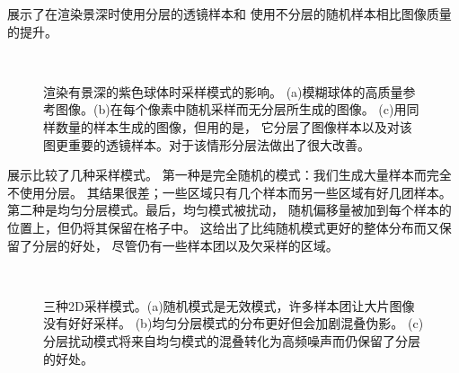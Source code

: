 展示了在渲染景深时使用分层的透镜样本和
使用不分层的随机样本相比图像质量的提升。
\begin{figure}[htbp]
    \,
    \\
    \caption{渲染有景深的紫色球体时采样模式的影响。
        (a)模糊球体的高质量参考图像。(b)在每个像素中随机采样而无分层所生成的图像。
        (c)用同样数量的样本生成的图像，但用的是，
        它分层了图像样本以及对该图更重要的透镜样本。对于该情形分层法做出了很大改善。}
    \label{fig:7.17}
\end{figure}

展示比较了几种采样模式。
第一种是完全随机的模式：我们生成大量样本而完全不使用分层。
其结果很差；一些区域只有几个样本而另一些区域有好几团样本。
第二种是均匀分层模式。最后，均匀模式被扰动，
随机偏移量被加到每个样本的位置上，但仍将其保留在格子中。
这给出了比纯随机模式更好的整体分布而又保留了分层的好处，
尽管仍有一些样本团以及欠采样的区域。
\begin{figure}[htbp]
    \,
    \\
    \caption{三种2D采样模式。(a)随机模式是无效模式，许多样本团让大片图像没有好好采样。
        (b)均匀分层模式的分布更好但会加剧混叠伪影。
        (c)分层扰动模式将来自均匀模式的混叠转化为高频噪声而仍保留了分层的好处。}
    \label{fig:7.18}
\end{figure}

